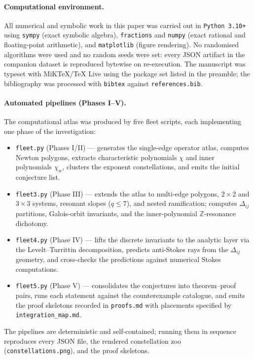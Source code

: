 \documentclass[11pt,a4paper]{article}
\theoremstyle{plain}
\theoremstyle{definition}
\theoremstyle{remark}
\begin{document}
\paragraph{Computational environment.}
All numerical and symbolic work in this paper was carried out in
\texttt{Python 3.10+} using \texttt{sympy} (exact symbolic algebra),
\texttt{fractions} and \texttt{numpy} (exact rational and floating-point
arithmetic), and \texttt{matplotlib} (figure rendering). No randomised
algorithms were used and no random seeds were set: every JSON artifact
in the companion dataset \cite{wkb_dataset_v1} is reproduced bytewise on
re-execution. The manuscript was typeset with MiKTeX/\TeX{} Live using
the package set listed in the preamble; the bibliography was processed
with \texttt{bibtex} against \texttt{references.bib}.

\paragraph{Automated pipelines (Phases I--V).}
The computational atlas was produced by five fleet scripts, each
implementing one phase of the investigation:
\begin{itemize}[leftmargin=2em,itemsep=2pt,topsep=2pt]
\item \texttt{fleet.py} (Phases I/II) --- generates the single-edge
  operator atlas, computes Newton polygons, extracts characteristic
  polynomials $\chi$ and inner polynomials $\chi_w$, clusters the
  exponent constellations, and emits the initial conjecture list.
\item \texttt{fleet3.py} (Phase III) --- extends the atlas to
  multi-edge polygons, $2\times 2$ and $3\times 3$ systems, resonant
  slopes ($q\le 7$), and nested ramification; computes
  $\Delta_{ij}$ partitions, Galois-orbit invariants, and the
  inner-polynomial $\mathbb{Z}$-resonance dichotomy.
\item \texttt{fleet4.py} (Phase IV) --- lifts the discrete invariants
  to the analytic layer via the Levelt--Turrittin decomposition,
  predicts anti-Stokes rays from the $\Delta_{ij}$ geometry, and
  cross-checks the predictions against numerical Stokes computations.
\item \texttt{fleet5.py} (Phase V) --- consolidates the conjectures
  into theorem--proof pairs, runs each statement against the
  counterexample catalogue, and emits the proof skeletons recorded in
  \texttt{proofs.md} with placements specified by
  \texttt{integration\_map.md}.
\end{itemize}
The pipelines are deterministic and self-contained; running them in
sequence reproduces every JSON file, the rendered constellation zoo
(\texttt{constellations.png}), and the proof skeletons.
\end{document}
